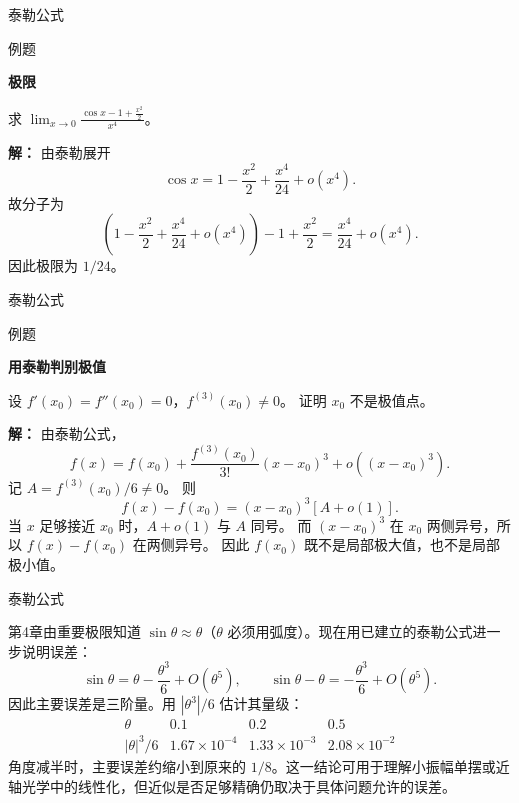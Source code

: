 \documentclass[aspectratio=169,10pt,fontset=fandol]{ctexbeamer}
\begin{document}
\begin{frame}[t,fragile]{泰勒公式}
\normalsize
\begin{block}{例题}
{\normalsize
\textbf{极限}\par

求 $\displaystyle\lim_{x\to0}\frac{\cos x-1+\frac{x^2}{2}}{x^4}$。

}
\end{block}
\pause
{\normalsize
\textbf{解：}
由泰勒展开
\[
\cos x=1-\frac{x^2}{2}+\frac{x^4}{24}+o(x^4).
\]
故分子为
\[
\left(1-\frac{x^2}{2}+\frac{x^4}{24}+o(x^4)\right)-1+\frac{x^2}{2}
=\frac{x^4}{24}+o(x^4).
\]
因此极限为 $1/24$。

}
\end{frame}
\begin{frame}[t,fragile]{泰勒公式}
\normalsize
\begin{block}{例题}
{\normalsize
\textbf{用泰勒判别极值}\par

设 $f'(x_0)=f''(x_0)=0$，$f^{(3)}(x_0)\neq0$。 证明 $x_0$ 不是极值点。

}
\end{block}
\pause
{\normalsize
\textbf{解：}
由泰勒公式，
\[
f(x)=f(x_0)+\frac{f^{(3)}(x_0)}{3!}(x-x_0)^3+o((x-x_0)^3).
\]
记 $A=f^{(3)}(x_0)/6\neq0$。 则
\[
f(x)-f(x_0)=(x-x_0)^3[A+o(1)].
\]
当 $x$ 足够接近 $x_0$ 时，$A+o(1)$ 与 $A$ 同号。 而 $(x-x_0)^3$ 在 $x_0$ 两侧异号，所以 $f(x)-f(x_0)$ 在两侧异号。 因此 $f(x_0)$ 既不是局部极大值，也不是局部极小值。

}
\end{frame}
\begin{frame}[t,fragile]{泰勒公式}
\normalsize
{\normalsize
\begin{application}
第4章由重要极限知道 $\sin\theta\approx\theta$（$\theta$ 必须用弧度）。现在用已建立的泰勒公式进一步说明误差：
\[
\sin\theta=\theta-\frac{\theta^3}{6}+O(\theta^5),
\qquad
\sin\theta-\theta=-\frac{\theta^3}{6}+O(\theta^5).
\]
因此主要误差是三阶量。用 $|\theta^3|/6$ 估计其量级：
\[
\begin{array}{c|ccc}
\theta&0.1&0.2&0.5\\ \hline
|\theta|^3/6&1.67\times10^{-4}&1.33\times10^{-3}&2.08\times10^{-2}
\end{array}
\]
角度减半时，主要误差约缩小到原来的 $1/8$。这一结论可用于理解小振幅单摆或近轴光学中的线性化，但近似是否足够精确仍取决于具体问题允许的误差。
\end{application}
}
\end{frame}
\end{document}
